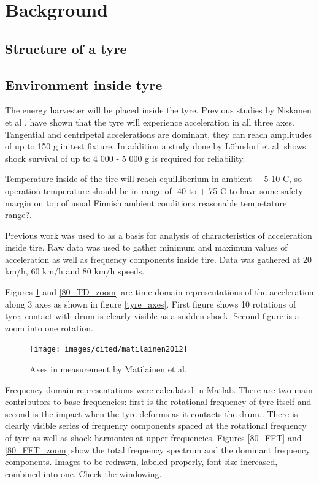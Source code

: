 \section{Background}

\subsection{Structure of a tyre}

\subsection{Environment inside tyre}
The energy harvester will be placed inside the tyre. Previous studies by Niskanen et al \cite{Niskanen2014}. have shown that the tyre will experience acceleration in all three axes. Tangential and centripetal accelerations are dominant, they can reach amplitudes of up to 150 g in test fixture. In addition a study done by Löhndorf et al. \cite{Lohndorf2007} shows shock survival of up to 4 000 - 5 000 g is required for reliability. 

Temperature inside of the tire will reach equilliberium in ambient + 5-10 \degree C, so operation temperature should be in range of -40 to + 75 \degree C to have some safety margin on top of usual Finnish ambient conditions {\color{red} reasonable tempetature range?}.

Previous work \cite{Niskanen2014} was used to as a basis for analysis of characteristics of acceleration inside tire. Raw data was used to gather minimum and maximum values of acceleration as well as frequency components inside tire. Data was gathered at 20 km/h, 60 km/h and 80 km/h speeds. 

Figures \ref{80_TD} and \ref{80_TD_zoom} are time domain representations of the acceleration along 3 axes as shown in figure \ref{tyre_axes}. First figure shows 10 rotations of tyre, contact with drum is clearly visible as a sudden shock. Second figure is a zoom into one rotation.

\begin{figure}[htb]
\begin{center}
\texttt{[image: images/cited/matilainen2012]}
\end{center}
\caption{Axes in measurement by Matilainen et al. \cite{Matilainen2012}}
\label{80_TD}
\end{figure}

Frequency domain representations were calculated in Matlab. There are two main contributors to base frequencies: first is the rotational frequency of tyre itself and second is the impact when the tyre deforms as it contacts the drum.. There is clearly visible series of frequency components spaced at the rotational frequency of tyre as well as shock harmonics at upper frequencies. Figures \ref{80_FFT} and \ref{80_FFT_zoom} show the total frequency spectrum and the dominant frequency components. {\color{red} Images to be redrawn, labeled properly, font size increased, combined into one. Check the windowing.}.

